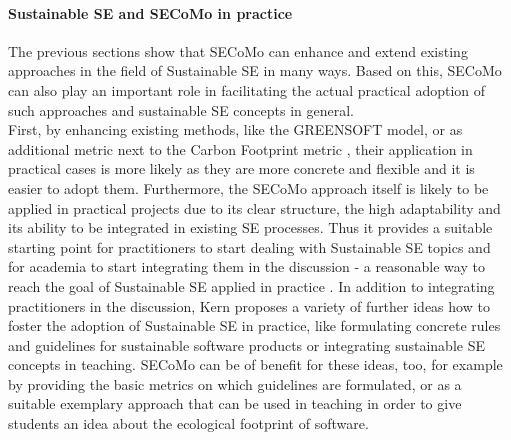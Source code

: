 \documentclass[oribibl]{llncs}
\begin{document}
\paragraph{Sustainable SE and SECoMo in practice}
The previous sections show that SECoMo can enhance and extend existing approaches in the field of Sustainable SE in many ways. Based on this, SECoMo can also play an important role in facilitating the actual practical adoption of such approaches and sustainable SE concepts in general.\\
First, by enhancing existing methods, like the GREENSOFT model, or as additional metric next to the Carbon Footprint metric \cite{kern_impacts_2015}, their application in practical cases is more likely as they are more concrete and flexible and it is easier to adopt them.
Furthermore, the SECoMo approach itself is likely to be applied in practical projects due to its clear structure, the high adaptability and its ability to be integrated in existing SE processes. %
Thus it provides a suitable starting point for practitioners to start dealing with Sustainable SE topics and for academia to start integrating them in the discussion - a reasonable way to reach the goal of Sustainable SE applied in practice \cite{kern_how_2016}.
In addition to integrating practitioners in the discussion, Kern \cite{kern_how_2016} proposes a variety of further ideas how to foster the adoption of Sustainable SE in practice, like formulating concrete rules and guidelines for sustainable software products or integrating sustainable SE concepts in teaching. SECoMo can be of benefit for these ideas, too, for example by providing the basic metrics on which guidelines are formulated, or as a suitable exemplary approach that can be used in teaching in order to give students an idea about the ecological footprint of software.\\ %
\end{document}

